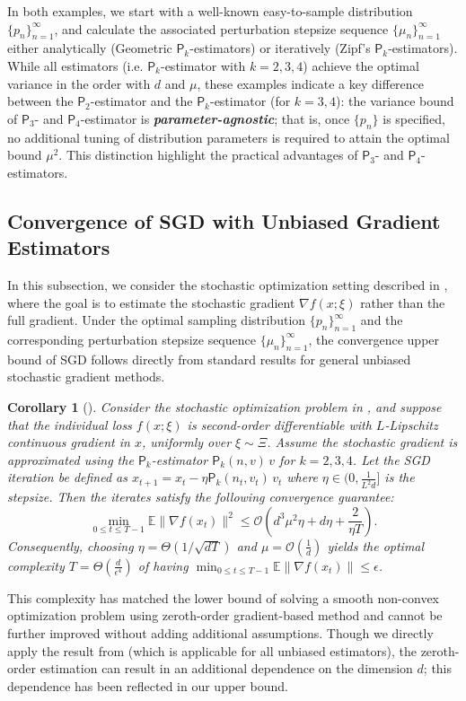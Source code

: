 \documentclass{article}
\newcommand{\EE}{\mathbb{E}}
\newcommand{\calO}{\mathcal{O}}
\theoremstyle{definition}
\theoremstyle{plain}
\newtheorem{corollary}[definition]{Corollary}
\theoremstyle{remark}
\newcommand{\sfP}{\mathsf{P}}
\begin{document}
In both examples, we start with a well-known easy-to-sample distribution $\{p_n\}_{n=1}^\infty$, and calculate the associated perturbation stepsize sequence $\{\mu_n\}_{n=1}^\infty$ either analytically (Geometric $\sfP_k$-estimators) or iteratively  (Zipf's $\sfP_k$-estimators). While  all estimators (i.e. $\sfP_k$-estimator with $k=2,3,4$) achieve the optimal variance in the order with $d$ and $\mu$,  these examples indicate a  key difference between the $\sfP_2$-estimator and the $\sfP_k$-estimator (for $k=3,4$): the variance bound of $\sfP_3$- and $\sfP_4$-estimator 
 is \textit{\textbf{parameter-agnostic}}; that is, once $\{p_n\}$ is specified, no additional tuning of distribution parameters is required to attain the optimal bound $\mu^2$.  This distinction highlight the practical advantages of \(\sfP_3\)- and \(\sfP_4\)-estimators. 

 


\subsection{Convergence of SGD with Unbiased Gradient Estimators}\label{sec:convergence}
In this subsection, we consider the stochastic optimization setting described in , where the goal is to estimate the stochastic gradient \(\nabla f(x; \xi)\) rather than the full gradient. Under the optimal sampling distribution \(\{p_n\}_{n=1}^\infty\) and the corresponding perturbation stepsize sequence \(\{\mu_n\}_{n=1}^\infty\), the convergence upper bound of SGD follows directly from standard results for general unbiased stochastic gradient methods.   

\begin{corollary}[\citet{khaled2022better}]\label{cor:sgd-convergence}
Consider the stochastic optimization problem in , and suppose that the individual loss \( f(x;\xi) \) is second-order differentiable with \( L \)-Lipschitz continuous gradient in \( x \), uniformly over \(\xi\sim\Xi\). Assume the stochastic gradient is approximated using the $\sfP_k$-estimator \( \sfP_k(n,v)\,v \) for \(k =2,3,4\). Let the SGD iteration be defined as $x_{t+1} = x_t - \eta \sfP_k(n_t, v_t)\,v_t$ where $\eta \in (0, \frac{1}{L^2d}]$ is the stepsize. Then the iterates satisfy the following convergence guarantee:
    $$\min_{0\leq t \leq T-1} \EE \|\nabla f(x_t)\|^2 \leq \calO(d^3 \mu^2  \eta + d \eta  +\frac{2}{\eta T}).$$
Consequently, choosing \(\eta = \Theta(1/\sqrt{dT})\) and $\mu = \mathcal{O}(\frac{1}{d})$ yields the optimal complexity $T = \Theta(\frac{d}{\epsilon^4})$ of having $\min_{0\leq t \leq T-1} \EE \|\nabla f(x_t)\| \leq \epsilon$. 
\end{corollary} 
 This complexity has matched the lower bound of solving a smooth non-convex optimization problem using zeroth-order gradient-based method \citep{duchi2015optimal} and cannot be further improved without adding additional assumptions.  Though we directly apply the result from \citet{khaled2022better} (which is applicable for all unbiased estimators), the zeroth-order estimation can result in an additional dependence on the dimension $d$; this dependence has been reflected in our upper bound.  
 
\end{document}
